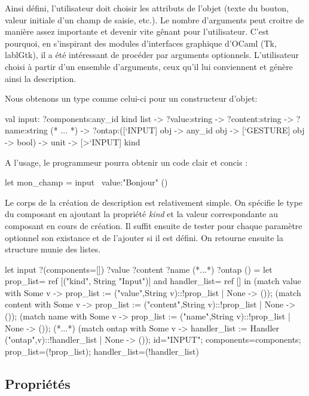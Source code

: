 \documentclass[11pt,a4paper]{report}
\begin{document}
Ainsi défini, l'utilisateur doit choisir les attributs de l'objet (texte du bouton, valeur initiale
d'un champ de saisie, etc.). Le nombre d'arguments peut croitre de manière assez importante et devenir
vite gênant pour l'utilisateur.
C'est pourquoi, en s'inspirant des modules d'interfaces graphique d'OCaml (Tk, lablGtk), il a été intéressant de
procéder par arguments optionnels. L'utilisateur choisi à partir d'un ensemble d'arguments, ceux qu'il 
lui conviennent et génère ainsi la description.

Nous obtenons un type comme celui-ci pour un constructeur d'objet:
\begin{OCaml}
  val input:
            ?components:any_id kind list
            -> ?value:string
            -> ?content:string
            -> ?name:string
            (* ... *)
     	    -> ?ontap:([`INPUT] obj -> any_id obj -> [`GESTURE] obj -> bool)
  	    -> unit -> [>`INPUT] kind
\end{OCaml}

A l'usage, le programmeur pourra obtenir un code clair et concis :
\begin{OCaml}
  let mon_champ = input ~value:"Bonjour" ()
\end{OCaml}

Le corps de la création de description est relativement simple.
On spécifie le type du composant en ajoutant la propriété \emph{kind} et la valeur
correspondante au composant en cours de création.
Il suffit ensuite de tester pour chaque paramètre optionnel son existance et de l'ajouter 
si il est défini. On retourne ensuite la structure munie des listes.
\begin{OCaml}
let input
	?(components=[])
	?value
        ?content
	?name
        (*...*)
	?ontap
	() =
   let prop_list= ref [("kind", String "Input")]
   and handler_list= ref [] in
   (match value with 
       Some v -> 
         prop_list := ("value",String v)::!prop_list 
     | None -> ());
   (match content with 
       Some v -> 
         prop_list := ("content",String v)::!prop_list 
     | None -> ());
  (match name with 
       Some v -> 
         prop_list := ("name",String v)::!prop_list
     | None -> ());
  (*...*)
  (match ontap with 
       Some v -> 
         handler_list := Handler ("ontap",v)::!handler_list 
     | None -> ());
  {id="INPUT"; components=components;
  prop_list=(!prop_list); handler_list=(!handler_list)}
\end{OCaml}

\subsection{Propriétés}
\end{document}
